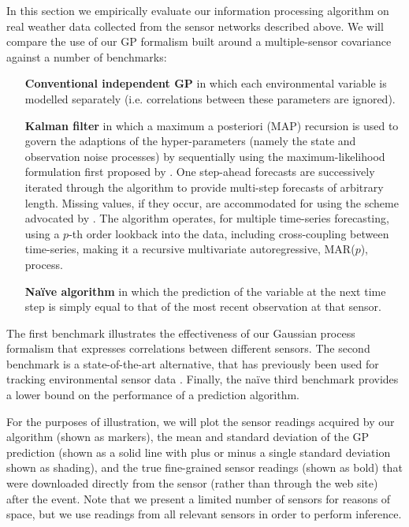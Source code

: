 \documentclass{acmsmall}
\begin{document}
\noindent In this section we empirically evaluate our information processing algorithm on real weather data collected from the sensor networks described above. 
We will compare the use of our GP formalism built around a multiple-sensor covariance against a number of benchmarks:
\begin{itemize}
\item[\bf Conventional independent GP\normalfont] in which each environmental variable is modelled separately (i.e. correlations between these parameters are ignored). 
\item[\bf Kalman filter\normalfont] in which a maximum a posteriori
(MAP) recursion is used to govern the adaptions of the hyper-parameters (namely the state and observation noise processes) by sequentially using the maximum-likelihood formulation first proposed by . One step-ahead forecasts are successively iterated through the algorithm to provide multi-step
forecasts of arbitrary length. Missing values, if they occur, are
accommodated for using the scheme advocated by 
.  The algorithm operates, for multiple time-series
forecasting, using a $p$-th order lookback into the data, including
cross-coupling between time-series, making it a recursive multivariate
autoregressive, MAR($p$), process.
\item[\bf Na\"{i}ve algorithm\normalfont] in which the prediction of the variable at the next time step is simply equal to that of the most recent observation at that sensor.
\end{itemize}
The first benchmark illustrates the effectiveness of our Gaussian process formalism that expresses correlations between different sensors. The second benchmark is a state-of-the-art alternative, that has previously been used for tracking environmental sensor data \cite{kalman_oceanography}. Finally, the na\"{i}ve third benchmark provides a lower bound on the performance of a prediction algorithm.

For the purposes of illustration, we will plot the sensor readings acquired by our algorithm (shown as markers), the mean and standard deviation of the GP prediction (shown as a solid line with plus or minus a single standard deviation shown as shading), and the true fine-grained sensor readings (shown as bold) that were downloaded directly from the sensor (rather than through the web site) after the event. Note that we present a limited number of sensors for reasons of space, but we use readings from all relevant sensors in order to perform inference. 
\end{document}

